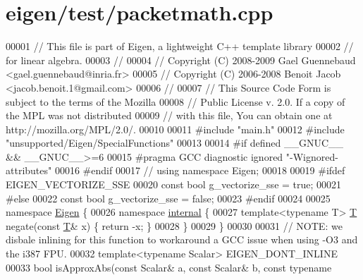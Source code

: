 \hypertarget{eigen_2test_2packetmath_8cpp_source}{}\section{eigen/test/packetmath.cpp}
\label{eigen_2test_2packetmath_8cpp_source}

\begin{DoxyCode}
00001 \textcolor{comment}{// This file is part of Eigen, a lightweight C++ template library}
00002 \textcolor{comment}{// for linear algebra.}
00003 \textcolor{comment}{//}
00004 \textcolor{comment}{// Copyright (C) 2008-2009 Gael Guennebaud <gael.guennebaud@inria.fr>}
00005 \textcolor{comment}{// Copyright (C) 2006-2008 Benoit Jacob <jacob.benoit.1@gmail.com>}
00006 \textcolor{comment}{//}
00007 \textcolor{comment}{// This Source Code Form is subject to the terms of the Mozilla}
00008 \textcolor{comment}{// Public License v. 2.0. If a copy of the MPL was not distributed}
00009 \textcolor{comment}{// with this file, You can obtain one at http://mozilla.org/MPL/2.0/.}
00010 
00011 \textcolor{preprocessor}{#include "main.h"}
00012 \textcolor{preprocessor}{#include "unsupported/Eigen/SpecialFunctions"}
00013 
00014 \textcolor{preprocessor}{#if defined \_\_GNUC\_\_ && \_\_GNUC\_\_>=6}
00015 \textcolor{preprocessor}{  #pragma GCC diagnostic ignored "-Wignored-attributes"}
00016 \textcolor{preprocessor}{#endif}
00017 \textcolor{comment}{// using namespace Eigen;}
00018 
00019 \textcolor{preprocessor}{#ifdef EIGEN\_VECTORIZE\_SSE}
00020 \textcolor{keyword}{const} \textcolor{keywordtype}{bool} g\_vectorize\_sse = \textcolor{keyword}{true};
00021 \textcolor{preprocessor}{#else}
00022 \textcolor{keyword}{const} \textcolor{keywordtype}{bool} g\_vectorize\_sse = \textcolor{keyword}{false};
00023 \textcolor{preprocessor}{#endif}
00024 
00025 \textcolor{keyword}{namespace }\hyperlink{namespace_eigen}{Eigen} \{
00026 \textcolor{keyword}{namespace }\hyperlink{namespaceinternal}{internal} \{
00027 \textcolor{keyword}{template}<\textcolor{keyword}{typename} T> \hyperlink{group___sparse_core___module}{T} negate(\textcolor{keyword}{const} \hyperlink{group___sparse_core___module}{T}& x) \{ \textcolor{keywordflow}{return} -x; \}
00028 \}
00029 \}
00030 
00031 \textcolor{comment}{// NOTE: we disbale inlining for this function to workaround a GCC issue when using -O3 and the i387 FPU.}
00032 \textcolor{keyword}{template}<\textcolor{keyword}{typename} Scalar> EIGEN\_DONT\_INLINE
00033 \textcolor{keywordtype}{bool} isApproxAbs(\textcolor{keyword}{const} Scalar& a, \textcolor{keyword}{const} Scalar& b, \textcolor{keyword}{const} \textcolor{keyword}{typename} 

\end{DoxyCode}
